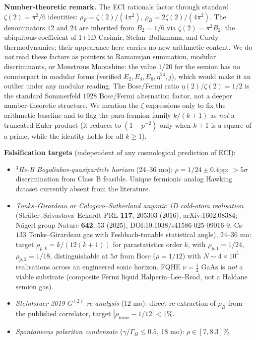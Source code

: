 \documentclass[reprint,amsmath,amssymb,aps,prd,superscriptaddress]{revtex4-2}
\providecommand{\1}{\mathbf{1}}
\begin{document}
\smallskip
\noindent\textbf{Number-theoretic remark.} The ECI rationals factor through standard
$\zeta(2)=\pi^2/6$ identities: $\rho_F = \zeta(2)/(4\pi^2)$, $\rho_B = 2\zeta(2)/(4\pi^2)$.
The denominators $12$ and $24$ are inherited from $B_2 = 1/6$ via $\zeta(2) = \pi^2 B_2$, the
ubiquitous coefficient of $1$+$1$D Casimir, Stefan--Boltzmann, and Cardy thermodynamics; their
appearance here carries no new arithmetic content. We do \emph{not} read these factors as
pointers to Ramanujan summation, modular discriminants, or Monstrous Moonshine: the value
$1/20$ for the semion has no counterpart in modular forms (verified $E_2,E_4,E_6,\eta^{24},j$),
which would make it an outlier under any modular reading. The Bose/Fermi ratio
$\eta(2)/\zeta(2)=1/2$ is the standard Sommerfeld $1928$ Bose/Fermi alternation factor, not a
deeper number-theoretic structure. We mention the $\zeta$ expressions only to fix the
arithmetic baseline and to flag the para-fermion family $k/(k+1)$ as \emph{not} a truncated
Euler product (it reduces to $(1-p^{-2})$ only when $k+1$ is a square of a prime, while the
identity holds for all $k\ge 1$).

\smallskip
\noindent\textbf{Falsification targets} (independent of any cosmological prediction of ECI):
\begin{itemize}
  \item \emph{$^3$He-B Bogoliubov-quasiparticle horizon} (24--36 mo): $\rho = 1/24 \pm 0.4$pp;
        $>5\sigma$ discrimination from Class B feasible. Unique fermionic analog Hawking dataset
        currently absent from the literature.
  \item \emph{Tonks--Girardeau or Calogero--Sutherland anyonic 1D cold-atom realisation}
        (Str\"ater--Srivastava--Eckardt PRL \textbf{117}, 205303 ($2016$), arXiv:1602.08384;
        N\"agerl group Nature \textbf{642}, 53 ($2025$), DOI:10.1038/s41586-025-09016-9, Cs-$133$ Tonks--Girardeau gas with Feshbach-tunable
        statistical angle), $24$--$36$ mo: target $\rho_{p,k} = k/(12(k+1))$ for parastatistics
        order $k$, with $\rho_{p,1} = 1/24$, $\rho_{p,2} = 1/18$, distinguishable at $5\sigma$
        from Bose ($\rho = 1/12$) with $N \sim 4\times 10^5$ realisations across an engineered
        sonic horizon. FQHE $\nu{=}\tfrac{1}{2}$ GaAs is \emph{not} a viable substrate
        (composite Fermi liquid Halperin--Lee--Read, not a Haldane semion gas).
  \item \emph{Steinhauer 2019 $G^{(2)}$ re-analysis} (12 mo): direct re-extraction of $\rho_B$
        from the published correlator, target $|\rho_\mathrm{meas} - 1/12| < 1\%$.
  \item \emph{Spontaneous polariton condensate} ($\gamma/\Gamma_H \le 0.5$, 18 mo): $\rho \in [7,8.3]\%$.
\end{itemize}
\end{document}
